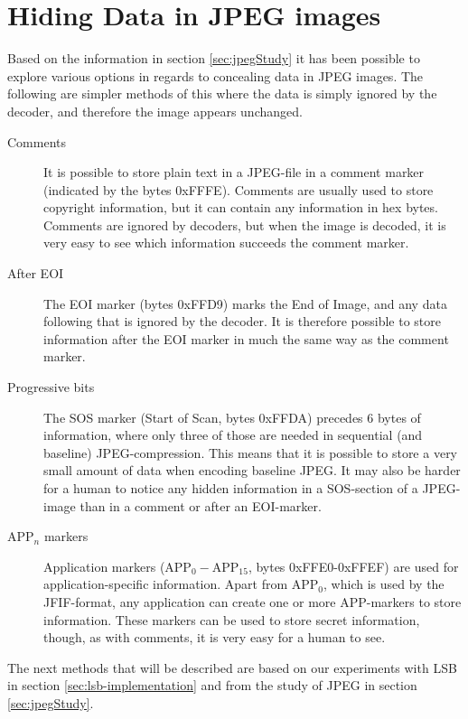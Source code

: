 
\section{Hiding Data in JPEG images}

Based on the information in section \ref{sec:jpegStudy} it has been possible to explore various options in regards to concealing data in JPEG images. The following are simpler methods of this where the data is simply ignored by the decoder, and therefore the image appears unchanged.

\begin{description}
	\item[Comments]
	It is possible to store plain text in a JPEG-file in a comment marker (indicated by the bytes 0xFFFE).
	Comments are usually used to store copyright information, but it can contain any information in hex bytes.
	Comments are ignored by decoders, but when the image is decoded, it is very easy to see which information succeeds the comment marker.

	\item[After EOI] 
	The EOI marker (bytes 0xFFD9) marks the End of Image, and any data following that is ignored by the decoder.
	It is therefore possible to store information after the EOI marker in much the same way as the comment marker.

	\item[Progressive bits]		
	The SOS marker (Start of Scan, bytes 0xFFDA) precedes 6 bytes of information, where only three of those are needed in sequential (and baseline) JPEG-compression.
	This means that it is possible to store a very small amount of data when encoding baseline JPEG.
	It may also be harder for a human to notice any hidden information in a SOS-section of a JPEG-image than in a comment or after an EOI-marker.

	\item[APP$_n$ markers]		
	Application markers (APP$_0-$APP$_{15}$, bytes 0xFFE0-0xFFEF) are used for application-specific information.
	Apart from APP$_0$, which is used by the JFIF-format, any application can create one or more APP-markers to store information.
	These markers can be used to store secret information, though, as with comments, it is very easy for a human to see.
\end{description}

The next methods that will be described are based on our experiments with LSB in section \ref{sec:lsb-implementation} and from the study of JPEG in section \ref{sec:jpegStudy}.

